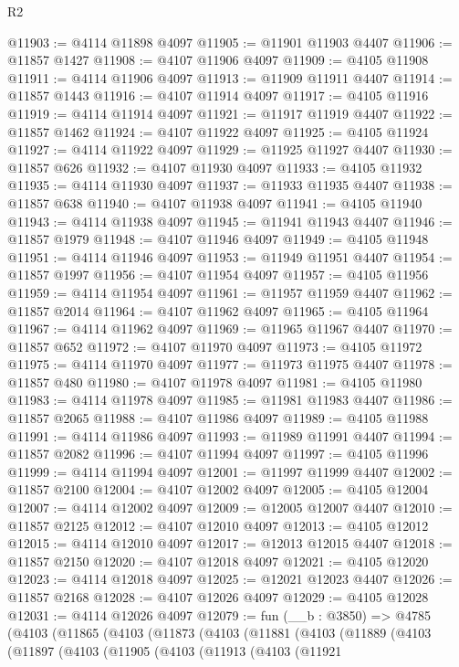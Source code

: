 \begin{lexlean}{R2}
\begin{coremodule}
@11903 := @4114 @11898 @4097
@11905 := @11901 @11903 @4407
@11906 := @11857 @1427
@11908 := @4107 @11906 @4097
@11909 := @4105 @11908
@11911 := @4114 @11906 @4097
@11913 := @11909 @11911 @4407
@11914 := @11857 @1443
@11916 := @4107 @11914 @4097
@11917 := @4105 @11916
@11919 := @4114 @11914 @4097
@11921 := @11917 @11919 @4407
@11922 := @11857 @1462
@11924 := @4107 @11922 @4097
@11925 := @4105 @11924
@11927 := @4114 @11922 @4097
@11929 := @11925 @11927 @4407
@11930 := @11857 @626
@11932 := @4107 @11930 @4097
@11933 := @4105 @11932
@11935 := @4114 @11930 @4097
@11937 := @11933 @11935 @4407
@11938 := @11857 @638
@11940 := @4107 @11938 @4097
@11941 := @4105 @11940
@11943 := @4114 @11938 @4097
@11945 := @11941 @11943 @4407
@11946 := @11857 @1979
@11948 := @4107 @11946 @4097
@11949 := @4105 @11948
@11951 := @4114 @11946 @4097
@11953 := @11949 @11951 @4407
@11954 := @11857 @1997
@11956 := @4107 @11954 @4097
@11957 := @4105 @11956
@11959 := @4114 @11954 @4097
@11961 := @11957 @11959 @4407
@11962 := @11857 @2014
@11964 := @4107 @11962 @4097
@11965 := @4105 @11964
@11967 := @4114 @11962 @4097
@11969 := @11965 @11967 @4407
@11970 := @11857 @652
@11972 := @4107 @11970 @4097
@11973 := @4105 @11972
@11975 := @4114 @11970 @4097
@11977 := @11973 @11975 @4407
@11978 := @11857 @480
@11980 := @4107 @11978 @4097
@11981 := @4105 @11980
@11983 := @4114 @11978 @4097
@11985 := @11981 @11983 @4407
@11986 := @11857 @2065
@11988 := @4107 @11986 @4097
@11989 := @4105 @11988
@11991 := @4114 @11986 @4097
@11993 := @11989 @11991 @4407
@11994 := @11857 @2082
@11996 := @4107 @11994 @4097
@11997 := @4105 @11996
@11999 := @4114 @11994 @4097
@12001 := @11997 @11999 @4407
@12002 := @11857 @2100
@12004 := @4107 @12002 @4097
@12005 := @4105 @12004
@12007 := @4114 @12002 @4097
@12009 := @12005 @12007 @4407
@12010 := @11857 @2125
@12012 := @4107 @12010 @4097
@12013 := @4105 @12012
@12015 := @4114 @12010 @4097
@12017 := @12013 @12015 @4407
@12018 := @11857 @2150
@12020 := @4107 @12018 @4097
@12021 := @4105 @12020
@12023 := @4114 @12018 @4097
@12025 := @12021 @12023 @4407
@12026 := @11857 @2168
@12028 := @4107 @12026 @4097
@12029 := @4105 @12028
@12031 := @4114 @12026 @4097
@12079 := fun (__b : @3850) =>
  @4785
    (@4103
      (@11865
        (@4103
          (@11873
            (@4103
              (@11881
                (@4103
                  (@11889
                    (@4103
                      (@11897
                        (@4103
                          (@11905
                            (@4103
                              (@11913
                                (@4103
                                  (@11921

\end{coremodule}
\end{lexlean}
